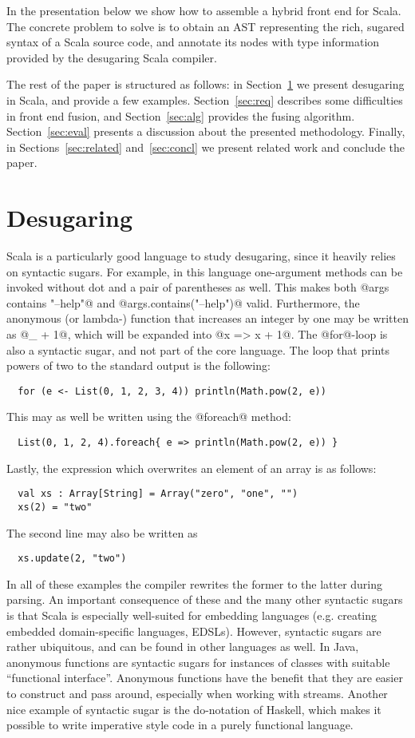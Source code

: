 \documentclass[11pt]{amsart}
\begin{document}
In the presentation below we show how to assemble a hybrid front end
for Scala. The concrete problem to solve is to obtain an AST representing
the rich, sugared syntax of a Scala source code, and annotate its nodes
with type information provided by the desugaring Scala compiler.

The rest of the paper is structured as follows: in
Section~\ref{sec:desugaring} we present desugaring in Scala, and
provide a few examples. Section~\ref{sec:req} describes some
difficulties in front end fusion, and Section~\ref{sec:alg}
provides the fusing algorithm. Section~\ref{sec:eval} presents a
discussion about the presented methodology. Finally, in
Sections~\ref{sec:related} and~\ref{sec:concl} we present related work
and conclude the paper.

\section{Desugaring}
\label{sec:desugaring}

Scala is a particularly good language to study desugaring, since it heavily relies
on syntactic sugars.  For example, in this language one-argument
methods can be invoked without dot and a pair of parentheses as well. This makes both
@args contains "--help"@ and @args.contains("--help")@
valid. Furthermore, the anonymous (or lambda-) function that increases an integer
by one may be written as  @_ + 1@, which will be expanded into
@x => x + 1@. The @for@-loop is also a syntactic sugar, and not
part of the core language. The loop that prints powers of two to the
standard output is the following:
\begin{lstlisting}
  for (e <- List(0, 1, 2, 3, 4)) println(Math.pow(2, e))
\end{lstlisting}
This may as well be written using the @foreach@ method:
\begin{lstlisting}
  List(0, 1, 2, 4).foreach{ e => println(Math.pow(2, e)) }
\end{lstlisting}
Lastly, the expression which overwrites an element of an array is as
follows:
\begin{lstlisting}
  val xs : Array[String] = Array("zero", "one", "")
  xs(2) = "two"
\end{lstlisting}
The second line may also be written as
\begin{lstlisting}
  xs.update(2, "two")
\end{lstlisting}

In all of these examples the compiler rewrites the former to the
latter during parsing. An important consequence of these and the
many other syntactic sugars is that Scala is especially well-suited
for embedding languages (e.g. creating embedded domain-specific languages, EDSLs).
However, syntactic sugars are rather ubiquitous, and can be found in other languages as well.
In Java, anonymous
functions are syntactic sugars for instances of classes with suitable
``functional interface''. Anonymous functions have the benefit that they
are easier to construct and pass around, especially when working with
streams. Another nice example of syntactic sugar is the do-notation of Haskell, which makes it possible to write
imperative style code in a purely functional language.
\end{document}
